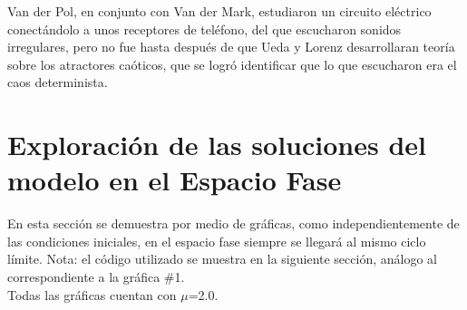 \documentclass[12pt]{article}
\begin{document}
Van der Pol, en conjunto con Van der Mark, estudiaron un circuito eléctrico conectándolo a unos receptores de teléfono, del que escucharon sonidos irregulares, pero no fue hasta después de que Ueda y Lorenz desarrollaran teoría sobre los atractores caóticos, que se logró identificar que lo que escucharon era el caos determinista.

\clearpage

\section{Exploración de las soluciones del modelo en el Espacio Fase}

En esta sección se demuestra por medio de gráficas, como independientemente de las condiciones iniciales, en el espacio fase siempre se llegará al mismo ciclo límite. Nota: el código utilizado se muestra en la siguiente sección, análogo al correspondiente a la gráfica \#1. \\

Todas las gráficas cuentan con $\mu$=2.0.
\end{document}
